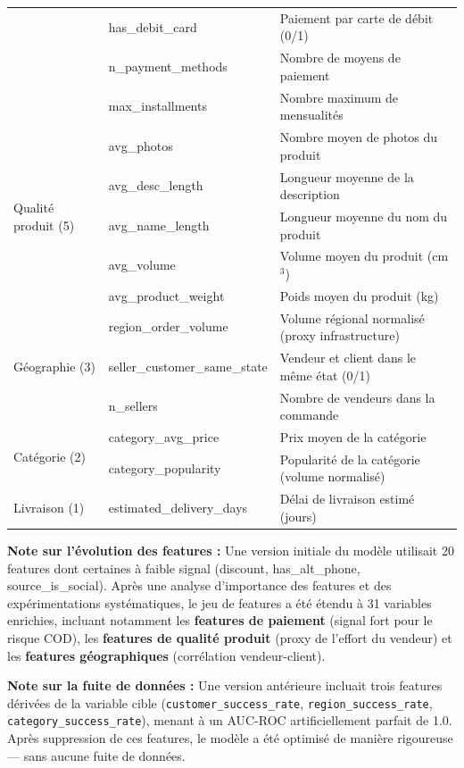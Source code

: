 \documentclass[12pt,a4paper]{report}
\begin{document}
\begin{longtable}{l l p{7cm}}
 & has\_debit\_card & Paiement par carte de d\'{e}bit (0/1) \\
 & n\_payment\_methods & Nombre de moyens de paiement \\
 & max\_installments & Nombre maximum de mensualit\'{e}s \\
\midrule
\multirow{5}{*}{Qualit\'{e} produit (5)} & avg\_photos & Nombre moyen de photos du produit \\
 & avg\_desc\_length & Longueur moyenne de la description \\
 & avg\_name\_length & Longueur moyenne du nom du produit \\
 & avg\_volume & Volume moyen du produit (cm$^3$) \\
 & avg\_product\_weight & Poids moyen du produit (kg) \\
\midrule
\multirow{3}{*}{G\'{e}ographie (3)} & region\_order\_volume & Volume r\'{e}gional normalis\'{e} (proxy infrastructure) \\
 & seller\_customer\_same\_state & Vendeur et client dans le m\^{e}me \'{e}tat (0/1) \\
 & n\_sellers & Nombre de vendeurs dans la commande \\
\midrule
\multirow{2}{*}{Cat\'{e}gorie (2)} & category\_avg\_price & Prix moyen de la cat\'{e}gorie \\
 & category\_popularity & Popularit\'{e} de la cat\'{e}gorie (volume normalis\'{e}) \\
\midrule
Livraison (1) & estimated\_delivery\_days & D\'{e}lai de livraison estim\'{e} (jours) \\
\bottomrule
\end{longtable}

\textbf{Note sur l'\'{e}volution des features :} Une version initiale du mod\`{e}le utilisait 20 features dont certaines \`{a} faible signal (discount, has\_alt\_phone, source\_is\_social). Apr\`{e}s une analyse d'importance des features et des exp\'{e}rimentations syst\'{e}matiques, le jeu de features a \'{e}t\'{e} \'{e}tendu \`{a} 31 variables enrichies, incluant notamment les \textbf{features de paiement} (signal fort pour le risque COD), les \textbf{features de qualit\'{e} produit} (proxy de l'effort du vendeur) et les \textbf{features g\'{e}ographiques} (corr\'{e}lation vendeur-client).

\textbf{Note sur la fuite de donn\'{e}es :} Une version ant\'{e}rieure incluait trois features d\'{e}riv\'{e}es de la variable cible (\texttt{customer\_success\_rate}, \texttt{region\_success\_rate}, \texttt{category\_success\_rate}), menant \`{a} un AUC-ROC artificiellement parfait de 1.0. Apr\`{e}s suppression de ces features, le mod\`{e}le a \'{e}t\'{e} optimis\'{e} de mani\`{e}re rigoureuse --- sans aucune fuite de donn\'{e}es.
\end{document}
